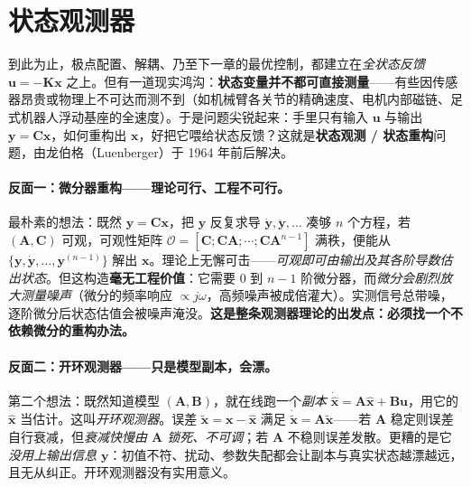 \section{状态观测器}
\label{sec:syn-observer}

到此为止，极点配置、解耦、乃至下一章的最优控制，都建立在\emph{全状态反馈} $\mathbf u=-\mathbf K\mathbf x$ 之上。但有一道现实鸿沟：\textbf{状态变量并不都可直接测量}——有些因传感器昂贵或物理上不可达而测不到（如机械臂各关节的精确速度、电机内部磁链、足式机器人浮动基座的全速度）。于是问题尖锐起来：手里只有输入 $\mathbf u$ 与输出 $\mathbf y=\mathbf C\mathbf x$，如何重构出 $\mathbf x$，好把它喂给状态反馈？这就是\textbf{状态观测 / 状态重构}问题，由龙伯格（Luenberger）于 1964 年前后解决\cite{liubao2006modern,luenberger1971introduction}。

\paragraph{反面一：微分器重构——理论可行、工程不可行。}
最朴素的想法：既然 $\mathbf y=\mathbf C\mathbf x$，把 $\mathbf y$ 反复求导 $\dot{\mathbf y},\ddot{\mathbf y},\dots$ 凑够 $n$ 个方程，若 $(\mathbf A,\mathbf C)$ 可观，可观性矩阵 $\mathcal O=[\mathbf C;\mathbf C\mathbf A;\cdots;\mathbf C\mathbf A^{n-1}]$ 满秩，便能从 $\{\mathbf y,\dot{\mathbf y},\dots,\mathbf y^{(n-1)}\}$ 解出 $\mathbf x$。理论上无懈可击——\emph{可观即可由输出及其各阶导数估出状态}。但这构造\textbf{毫无工程价值}\cite{liubao2006modern}：它需要 $0$ 到 $n-1$ 阶微分器，而\emph{微分会剧烈放大测量噪声}（微分的频率响应 $\propto j\omega$，高频噪声被成倍灌大）。实测信号总带噪，逐阶微分后状态估值会被噪声淹没。\textbf{这是整条观测器理论的出发点：必须找一个不依赖微分的重构办法。}

\paragraph{反面二：开环观测器——只是模型副本，会漂。}
第二个想法：既然知道模型 $(\mathbf A,\mathbf B)$，就在线跑一个\emph{副本} $\dot{\hat{\mathbf x}}=\mathbf A\hat{\mathbf x}+\mathbf B\mathbf u$，用它的 $\hat{\mathbf x}$ 当估计。这叫\emph{开环观测器}。误差 $\tilde{\mathbf x}=\mathbf x-\hat{\mathbf x}$ 满足 $\dot{\tilde{\mathbf x}}=\mathbf A\tilde{\mathbf x}$——若 $\mathbf A$ 稳定则误差自行衰减，但\emph{衰减快慢由 $\mathbf A$ 锁死、不可调}；若 $\mathbf A$ 不稳则误差发散。更糟的是它\emph{没用上输出信息 $\mathbf y$}：初值不符、扰动、参数失配都会让副本与真实状态越漂越远，且无从纠正。开环观测器没有实用意义。

